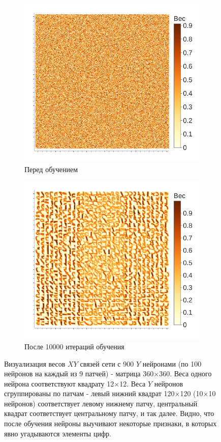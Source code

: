 \documentclass[a4paper]{article}
\begin{document}
\begin{figure}
\centering
\begin{subfigure}{0.45\textwidth}
    \includegraphics[width=\textwidth,keepaspectratio=true]{weights_XY_untrained_ru.pdf}
    \caption{Перед обучением}
\end{subfigure}
\begin{subfigure}{0.45\textwidth}  \label{weights_XY}
    \includegraphics[width=\textwidth,keepaspectratio=true]{weights_XY_ru.pdf}
    \caption{После 10000 итераций обучения}
\end{subfigure}
\caption{Визуализация весов $XY$ связей сети с 900 $Y$ нейронами (по 100 нейронов на каждый из 9 патчей) - матрица 360$\times$360. Веса одного нейрона соответствуют квадрату 12$\times$12. Веса $Y$ нейронов сгруппированы по патчам - левый нижний квадрат 120$\times$120 (10$\times$10 нейронов) соответствует левому нижнему патчу, центральный квадрат соответствует центральному патчу, и так далее. Видно, что после обучения нейроны выучивают некоторые признаки, в которых явно угадываются элементы цифр.}
\end{figure}
\end{document}
